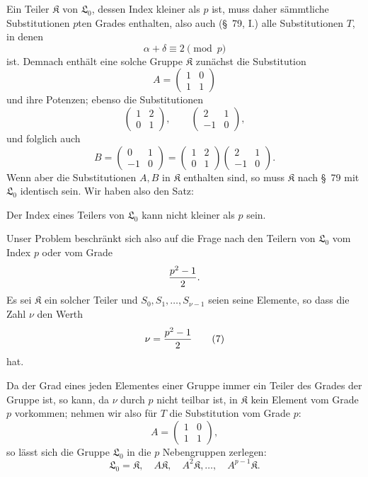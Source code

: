 \documentclass[11pt]{article}
\providecommand{\Lzero}{\mathfrak L_0}
\providecommand{\Kgrp}{\mathfrak K}
\begin{document}
Ein Teiler $\Kgrp$ von $\Lzero$, dessen Index kleiner als $p$ ist, muss daher sämmtliche Substitutionen $p$ten Grades enthalten, also auch (\S~79, I.) alle Substitutionen $T$, in denen
\begin{equation}
 \alpha+\delta\equiv2\pmod p
\tag{4}
\end{equation}
ist. Demnach enthält eine solche Gruppe $\Kgrp$ zunächst die Substitution
\begin{equation}
 A=\begin{pmatrix}1&0\\1&1\end{pmatrix}
\tag{5}
\end{equation}
und ihre Potenzen; ebenso die Substitutionen
\[
 \begin{pmatrix}1&2\\0&1\end{pmatrix},\qquad
 \begin{pmatrix}2&1\\-1&0\end{pmatrix},
\]
und folglich auch
\begin{equation}
 B=\begin{pmatrix}0&1\\-1&0\end{pmatrix}
 =
 \begin{pmatrix}1&2\\0&1\end{pmatrix}
 \begin{pmatrix}2&1\\-1&0\end{pmatrix}.
\tag{6}
\end{equation}
Wenn aber die Substitutionen $A,B$ in $\Kgrp$ enthalten sind, so muss $\Kgrp$ nach \S~79 mit $\Lzero$ identisch sein. Wir haben also den Satz:

Der Index eines Teilers von $\Lzero$ kann nicht kleiner als $p$ sein.

Unser Problem beschränkt sich also auf die Frage nach den Teilern von $\Lzero$ vom Index $p$ oder vom Grade
\[
 {p^2-1\over2}.
\]
Es sei $\Kgrp$ ein solcher Teiler und $S_0,S_1,\ldots,S_{\nu-1}$ seien seine Elemente, so dass die Zahl $\nu$ den Werth
\begin{equation}
 \nu={p^2-1\over2}
\tag{7}
\end{equation}
hat.

Da der Grad eines jeden Elementes einer Gruppe immer ein Teiler des Grades der Gruppe ist, so kann, da $\nu$ durch $p$ nicht teilbar ist, in $\Kgrp$ kein Element vom Grade $p$ vorkommen; nehmen wir also für $T$ die Substitution vom Grade $p$:
\begin{equation}
 A=\begin{pmatrix}1&0\\1&1\end{pmatrix},
\tag{8}
\end{equation}
so lässt sich die Gruppe $\Lzero$ in die $p$ Nebengruppen zerlegen:
\begin{equation}
 \Lzero=\Kgrp,\quad A\Kgrp,\quad A^2\Kgrp,\ldots,\quad A^{p-1}\Kgrp.
\tag{9}
\end{equation}
\end{document}
